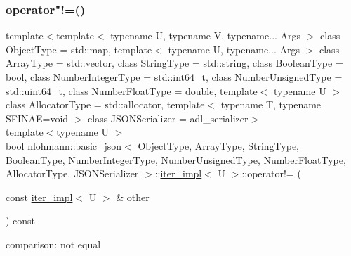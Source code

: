 \subsubsection{\texorpdfstring{operator"!=()}{operator!=()}}
{\footnotesize\ttfamily template$<$template$<$ typename U, typename V, typename... Args $>$ class Object\+Type = std\+::map, template$<$ typename U, typename... Args $>$ class Array\+Type = std\+::vector, class String\+Type  = std\+::string, class Boolean\+Type  = bool, class Number\+Integer\+Type  = std\+::int64\+\_\+t, class Number\+Unsigned\+Type  = std\+::uint64\+\_\+t, class Number\+Float\+Type  = double, template$<$ typename U $>$ class Allocator\+Type = std\+::allocator, template$<$ typename T, typename S\+F\+I\+N\+A\+E=void $>$ class J\+S\+O\+N\+Serializer = adl\+\_\+serializer$>$ \\
template$<$typename U $>$ \\
bool \mbox{\hyperlink{classnlohmann_1_1basic__json}{nlohmann\+::basic\+\_\+json}}$<$ Object\+Type, Array\+Type, String\+Type, Boolean\+Type, Number\+Integer\+Type, Number\+Unsigned\+Type, Number\+Float\+Type, Allocator\+Type, J\+S\+O\+N\+Serializer $>$\+::\mbox{\hyperlink{classnlohmann_1_1basic__json_1_1iter__impl}{iter\+\_\+impl}}$<$ U $>$\+::operator!= (\begin{DoxyParamCaption}\item[{const \mbox{\hyperlink{classnlohmann_1_1basic__json_1_1iter__impl}{iter\+\_\+impl}}$<$ U $>$ \&}]{other }\end{DoxyParamCaption}) const\hspace{0.3cm}{\ttfamily [inline]}}



comparison\+: not equal 

